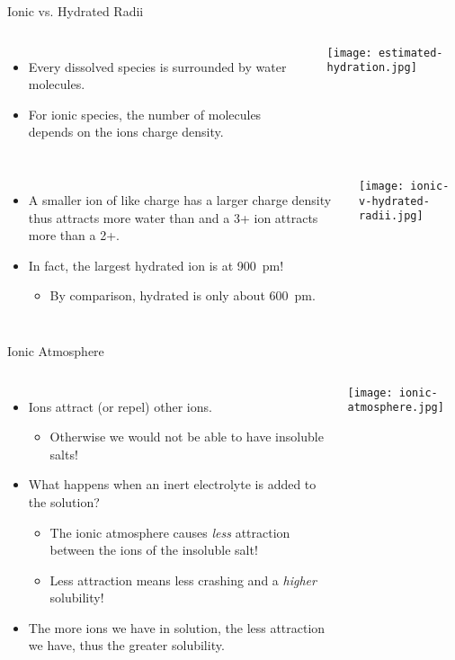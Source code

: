\documentclass[notes=onlyslideswithnotes,notes=hide]{beamer}
\begin{document}
\begin{frame}[allowframebreaks]{Ionic vs. Hydrated Radii}
	\begin{columns}
		\begin{itemize}
			\item Every dissolved species is surrounded by water
				molecules.
			\item For ionic species, the number of 
				molecules depends on the ions charge density.
		\end{itemize}
		\texttt{[image: estimated-hydration.jpg]}
	\end{columns}

	\framebreak

	\begin{columns}
		\column{0.45\linewidth}
		\begin{itemize}
			\item A smaller ion of like charge has a larger charge
				density thus  attracts more water than
				 and a 3+ ion attracts more than a 2+.
			\item In fact, the largest hydrated ion is \ch{H3O+} at
				\SI{900}{\pico\meter}!
				\begin{itemize}
					\item By comparison, hydrated \ch{Li+}
						is only about
						\SI{600}{\pico\meter}.
				\end{itemize}
		\end{itemize}
		\column{0.45\linewidth}
		\texttt{[image: ionic-v-hydrated-radii.jpg]}
	\end{columns}
\end{frame}

\begin{frame}{Ionic Atmosphere}
	\begin{columns}
		\column{0.6\linewidth}
	\begin{itemize}[<+->]
		\item Ions attract (or repel) other ions.
			\begin{itemize}
				\item Otherwise we would not be able to have
					insoluble salts!
			\end{itemize}
		\item What happens when an inert electrolyte is added to the
			solution?
			\begin{itemize}
				\item The ionic atmosphere causes \emph{less}
					attraction between the ions of the
					insoluble salt!
				\item Less attraction means less crashing and a
					\emph{higher} solubility!
			\end{itemize}
		\item The more ions we have in solution, the less attraction we
			have, thus the greater solubility.
	\end{itemize}
		\column{0.4\linewidth}
		\texttt{[image: ionic-atmosphere.jpg]}
	\end{columns}
\end{frame}
\end{document}
